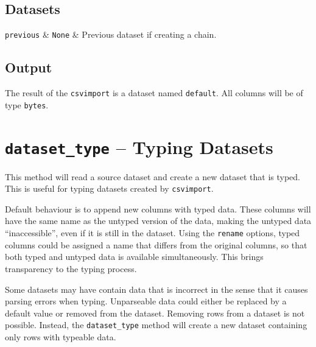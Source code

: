\subsection{Datasets}

\starttable
  \RP \texttt{previous} & \texttt{None} & Previous dataset if creating a
  chain.\\
\stoptable

\subsection{Output}
The result of the \texttt{csvimport} is a dataset named
\texttt{default}.  All columns will be of type \texttt{bytes}.







\clearpage
\section{\texttt{dataset\_type} -- Typing Datasets}
This method will read a source dataset and create a new dataset that
is typed.  This is useful for typing datasets created by
\texttt{csvimport}.

Default behaviour is to append new columns with typed data.  These
columns will have the same name as the untyped version of the data,
making the untyped data ``inaccessible'', even if it is still in the
dataset.  Using the \texttt{rename} options, typed columns could be
assigned a name that differs from the original columns, so that both
typed and untyped data is available simultaneously.  This brings
transparency to the typing process.

Some datasets may have contain data that is incorrect in the sense
that it causes parsing errors when typing.  Unparseable data could
either be replaced by a default value or removed from the dataset.
Removing rows from a dataset is not possible.  Instead, the
\texttt{dataset\_type} method will create a new dataset containing
only rows with typeable data.









